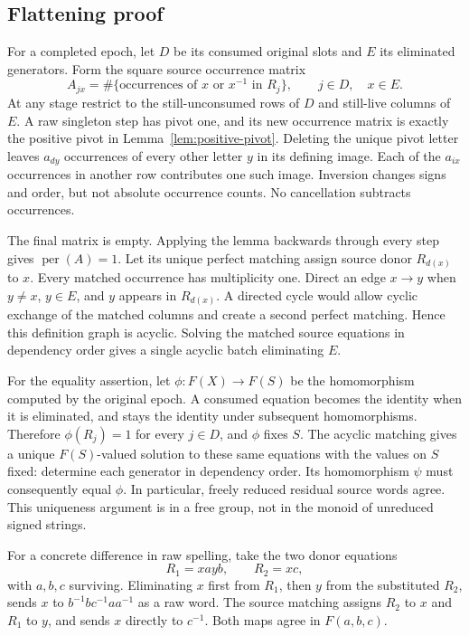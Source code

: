 \subsection{Flattening proof}

For a completed epoch, let $D$ be its consumed original slots and $E$ its
eliminated generators. Form the square source occurrence matrix
\[
 A_{jx}=\#\{\text{occurrences of }x\text{ or }x^{-1}\text{ in }R_j\},
 \qquad j\in D,\quad x\in E.
\]
At any stage restrict to the still-unconsumed rows of $D$ and still-live
columns of $E$. A raw singleton step has pivot one, and its new occurrence
matrix is exactly the positive pivot in Lemma~\ref{lem:positive-pivot}.
Deleting the unique pivot letter leaves $a_{dy}$ occurrences of every other
letter $y$ in its defining image. Each of the $a_{ix}$ occurrences in
another row contributes one such image. Inversion changes signs and order,
but not absolute occurrence counts. No cancellation subtracts occurrences.

The final matrix is empty. Applying the lemma backwards through every step
gives $\operatorname{per}(A)=1$. Let its unique perfect matching assign
source donor $R_{d(x)}$ to $x$. Every matched occurrence has multiplicity
one. Direct an edge $x\to y$ when $y\ne x$, $y\in E$, and $y$ appears in
$R_{d(x)}$. A directed cycle would allow cyclic exchange of the matched
columns and create a second perfect matching. Hence this definition graph
is acyclic. Solving the matched source equations in dependency order gives
a single acyclic batch eliminating $E$.

For the equality assertion, let $\phi:F(X)\to F(S)$ be the homomorphism
computed by the original epoch. A consumed equation becomes the identity
when it is eliminated, and stays the identity under subsequent
homomorphisms. Therefore $\phi(R_j)=1$ for every $j\in D$, and $\phi$ fixes
$S$. The acyclic matching gives a unique $F(S)$-valued solution to these
same equations with the values on $S$ fixed: determine each generator in
dependency order. Its homomorphism $\psi$ must consequently equal $\phi$.
In particular, freely reduced residual source words agree. This uniqueness
argument is in a free group, not in the monoid of unreduced signed strings.

For a concrete difference in raw spelling, take the two donor equations
\[
 R_1=xayb,\qquad R_2=xc,
\]
with $a,b,c$ surviving. Eliminating $x$ first from $R_1$, then $y$ from
the substituted $R_2$, sends $x$ to
$b^{-1}bc^{-1}aa^{-1}$ as a raw word. The source matching assigns $R_2$ to
$x$ and $R_1$ to $y$, and sends $x$ directly to $c^{-1}$. Both maps agree
in $F(a,b,c)$.

